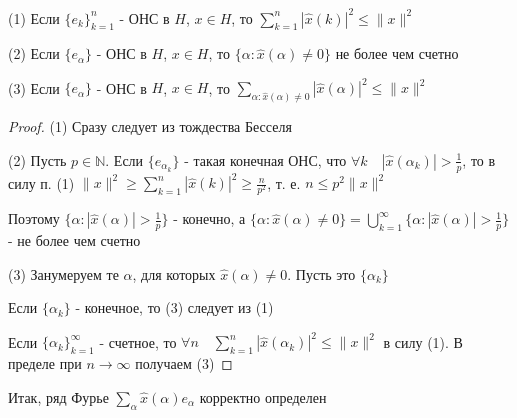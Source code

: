 \documentclass[a4paper,12pt]{report}
\begin{document}
\begin{cons}
(1) Если $\{e_k\}_{k=1}^n$ - ОНС в $H$, $x\in H$, то $\sum\limits_{k=1}^n|\hat x(k)|^2\le\|x\|^2$

(2) Если $\{e_\alpha\}$ - ОНС в $H$, $x\in H$, то $\{\alpha\colon\hat x(\alpha)\ne0\}$ не более чем счетно

(3) Если $\{e_\alpha\}$ - ОНС в $H$, $x\in H$, то $\sum\limits_{\alpha\colon\hat x(\alpha)\ne0}|\hat x(\alpha)|^2\le\|x\|^2$
\end{cons}
\begin{proof}
(1) Сразу следует из тождества Бесселя

(2) Пусть $p\in\mathbb N$. Если $\{e_{\alpha_k}\}$ - такая конечная ОНС, что $\forall k\quad|\hat x(\alpha_k)|>\frac1p$, то в силу п. (1) $\|x\|^2\ge\sum\limits_{k=1}^n|\hat x(k)|^2\ge\frac{n}{p^2}$, т. е. $n\le p^2\|x\|^2$

Поэтому $\{\alpha\colon|\hat x(\alpha)|>\frac1p\}$ - конечно, а $\{\alpha\colon\hat x(\alpha)\ne0\}=\bigcup\limits_{k=1}^\infty\{\alpha\colon|\hat x(\alpha)|>\frac1p\}$ - не более чем счетно

(3) Занумеруем те $\alpha$, для которых $\hat x(\alpha)\ne0$. Пусть это $\{\alpha_k\}$

Если $\{\alpha_k\}$ - конечное, то (3) следует из (1)

Если $\{\alpha_k\}_{k=1}^\infty$ - счетное, то $\forall n\quad\sum\limits_{k=1}^n|\hat x(\alpha_k)|^2\le\|x\|^2$ в силу (1). В пределе при $n\to\infty$ получаем (3)

\end{proof}
 


\noindent Итак, ряд Фурье $\sum\limits_\alpha\hat x(\alpha)e_\alpha$ корректно определен
 
\end{document}
